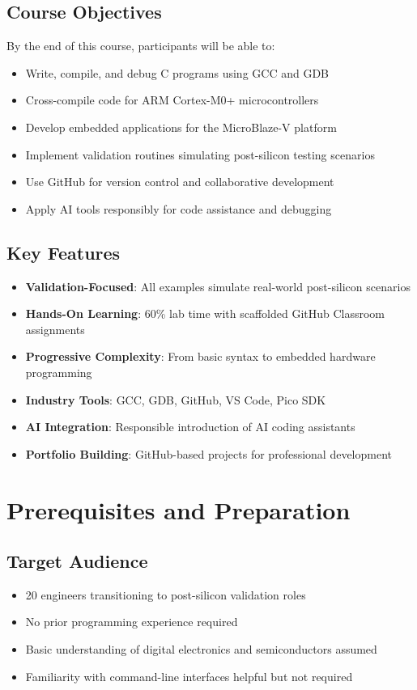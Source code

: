 \documentclass[11pt,a4paper]{article}
\begin{document}
\subsection{Course Objectives}
By the end of this course, participants will be able to:
\begin{itemize}
    \item Write, compile, and debug C programs using GCC and GDB
    \item Cross-compile code for ARM Cortex-M0+ microcontrollers
    \item Develop embedded applications for the MicroBlaze-V platform
    \item Implement validation routines simulating post-silicon testing scenarios
    \item Use GitHub for version control and collaborative development
    \item Apply AI tools responsibly for code assistance and debugging
\end{itemize}

\subsection{Key Features}
\begin{itemize}
    \item \textbf{Validation-Focused}: All examples simulate real-world post-silicon scenarios
    \item \textbf{Hands-On Learning}: 60\% lab time with scaffolded GitHub Classroom assignments
    \item \textbf{Progressive Complexity}: From basic syntax to embedded hardware programming
    \item \textbf{Industry Tools}: GCC, GDB, GitHub, VS Code, Pico SDK
    \item \textbf{AI Integration}: Responsible introduction of AI coding assistants
    \item \textbf{Portfolio Building}: GitHub-based projects for professional development
\end{itemize}

\section{Prerequisites and Preparation}

\subsection{Target Audience}
\begin{itemize}
    \item 20 engineers transitioning to post-silicon validation roles
    \item No prior programming experience required
    \item Basic understanding of digital electronics and semiconductors assumed
    \item Familiarity with command-line interfaces helpful but not required
\end{itemize}
\end{document}
